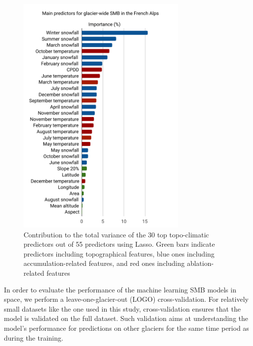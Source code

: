 \begin{figure}
\centering
\includegraphics[width=8.3cm]{Figures/methods/Figure_5.pdf}
\caption{Contribution to the total variance of the 30 top topo-climatic predictors out of 55 predictors using Lasso. Green bars indicate predictors including topographical features, blue ones including accumulation-related features, and red ones including ablation-related features}
\label{methods:fig5}
\end{figure}

In order to evaluate the performance of the machine learning SMB models in space, we perform a leave-one-glacier-out (LOGO) cross-validation. For relatively small datasets like the one used in this study, cross-validation ensures that the model is validated on the full dataset. Such validation aims at understanding the model’s performance for predictions on other glaciers for the same time period as during the training. 

